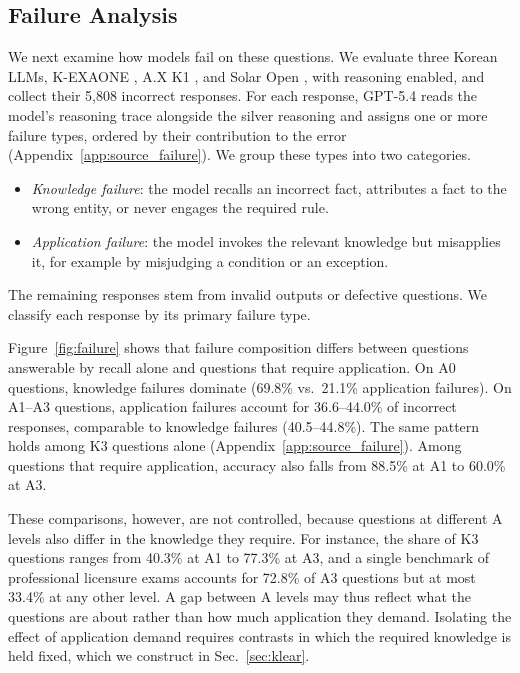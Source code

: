 

\subsection{Failure Analysis}
\label{sec:failure}

We next examine how models fail on these questions.
We evaluate three Korean LLMs, K-EXAONE \citep{choi2026k}, A.X K1 \citep{cheon2026ax}, and Solar Open \citep{park2026solar}, with reasoning enabled, and collect their 5,808 incorrect responses.
For each response, GPT-5.4 reads the model's reasoning trace alongside the silver reasoning and assigns one or more failure types, ordered by their contribution to the error (Appendix~\ref{app:source_failure}).
We group these types into two categories.
\begin{itemize}[leftmargin=3.5mm, topsep=2pt, itemsep=2pt, parsep=0pt]
    \item[$\circ$] \textit{Knowledge failure}: the model recalls an incorrect fact, attributes a fact to the wrong entity, or never engages the required rule.
    \item[$\circ$] \textit{Application failure}: the model invokes the relevant knowledge but misapplies it, for example by misjudging a condition or an exception.
\end{itemize}
The remaining responses stem from invalid outputs or defective questions.
We classify each response by its primary failure type. 



Figure~\ref{fig:failure} shows that failure composition differs between questions answerable by recall alone and questions that require application.
On A0 questions, knowledge failures dominate (69.8\% vs.\ 21.1\% application failures).
On A1--A3 questions, application failures account for 36.6--44.0\% of incorrect responses, comparable to knowledge failures (40.5--44.8\%).
The same pattern holds among K3 questions alone (Appendix~\ref{app:source_failure}).
Among questions that require application, accuracy also falls from 88.5\% at A1 to 60.0\% at A3.

These comparisons, however, are not controlled, because questions at different A levels also differ in the knowledge they require.
For instance, the share of K3 questions ranges from 40.3\% at A1 to 77.3\% at A3, and a single benchmark of professional licensure exams accounts for 72.8\% of A3 questions but at most 33.4\% at any other level. 
A gap between A levels may thus reflect what the questions are about rather than how much application they demand.
Isolating the effect of application demand requires contrasts in which the required knowledge is held fixed, which we construct in Sec.~\ref{sec:klear}.